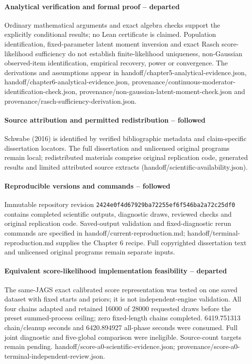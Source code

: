 \documentclass[11pt]{article}
\begin{document}
\paragraph{Analytical verification and formal proof -- departed} Ordinary mathematical arguments and exact algebra checks support the explicitly conditional results; no Lean certificate is claimed. Population identification, fixed-parameter latent moment inversion and exact Rasch score-likelihood sufficiency do not establish finite-likelihood uniqueness, non-Gaussian observed-item identification, empirical recovery, power or convergence. The derivations and assumptions appear in handoff/chapter5-analytical-evidence.json, handoff/chapter6-analytical-evidence.json, provenance/continuous-moderator-identification-check.json, provenance/non-gaussian-latent-moment-check.json and provenance/rasch-sufficiency-derivation.json.
\paragraph{Source attribution and permitted redistribution -- followed}  Schwabe (2016) is identified by verified bibliographic metadata and claim-specific dissertation locators. The full dissertation and unlicensed original programs remain local; redistributed materials comprise original replication code, generated results and limited attributed source extracts (handoff/scientific-availability.json).
\paragraph{Reproducible versions and commands -- followed}  Immutable repository revision \nolinkurl{2424e0f4d67929ba72255ef6f546ba2a72c25df0} contains completed scientific outputs, diagnostic draws, reviewed checks and original replication code. Saved-output validation and fixed-diagnostic rerun commands are specified in handoff/current-reproduction.md; handoff/terminal-reproduction.md supplies the Chapter 6 recipe. Full copyrighted dissertation text and unlicensed original programs remain separate inputs.
\paragraph{Equivalent score-likelihood implementation feasibility -- departed} The same-JAGS exact calibrated score representation was tested on one saved dataset with fixed starts and priors; it is not independent-engine validation. All four chains adapted and retained 16000 of 28000 requested draws before the preset summed-process ceiling; zero fixed-length chains completed. 6419.751313 chain/cleanup seconds and 6420.894927 all-phase seconds were consumed. Full joint diagnostic and five-global comparison were ineligible. Source-count targets remain pending. handoff/score-a0-scientific-evidence.json; provenance/score-a0-terminal-independent-review.json.
\end{document}
